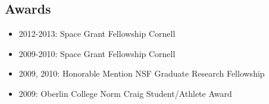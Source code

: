 \documentclass[11pt, oneside]{article}   	%
\begin{document}
%
%

\vspace{-0.15in}
\subsection*{Awards}
\begin{itemize}[noitemsep]
        \item 2012-2013: Space Grant Fellowship Cornell
        \item 2009-2010: Space Grant Fellowship Cornell
        \item 2009, 2010: Honorable Mention NSF Graduate Research Fellowship 
        \item 2009: Oberlin College Norm Craig Student/Athlete Award
\end{itemize}
\end{document}
